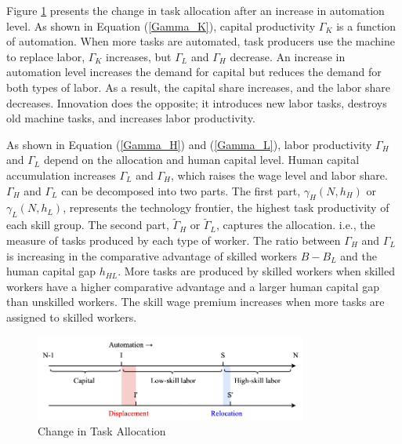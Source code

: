 \documentclass[12pt]{article}
\begin{document}
Figure \ref{allocation2} presents the change in task allocation after an increase in automation level. As shown in Equation (\ref{Gamma_K}), capital productivity $\Gamma_K$ is a function of automation. When more tasks are automated, task producers use the machine to replace labor, $\Gamma_K$ increases, but $\Gamma_L$ and $\Gamma_H$ decrease. An increase in automation level increases the demand for capital but reduces the demand for both types of labor. As a result, the capital share increases, and the labor share decreases. Innovation does the opposite; it introduces new labor tasks, destroys old machine tasks, and increases labor productivity. 

As shown in Equation (\ref{Gamma_H}) and (\ref{Gamma_L}), labor productivity $\Gamma_H$ and $\Gamma_L$ depend on the allocation and human capital level. Human capital accumulation increases $\Gamma_L$ and $\Gamma_H$, which raises the wage level and labor share. $\Gamma_H$ and $\Gamma_L$ can be decomposed into two parts. The first part, $\gamma_H(N,h_H)$ or $\gamma_L(N,h_L)$, represents the technology frontier, the highest task productivity of each skill group. The second part, $\tilde{\Gamma}_H$ or $\tilde{\Gamma}_L$, captures the allocation. i.e., the measure of tasks produced by each type of worker. The ratio between $\Gamma_H$ and $\Gamma_L$ is increasing in the comparative advantage of skilled workers $B-B_L$ and the human capital gap $h_{HL}$. More tasks are produced by skilled workers when skilled workers have a higher comparative advantage and a larger human capital gap than unskilled workers. The skill wage premium increases when more tasks are assigned to skilled workers. 

\begin{figure}[h!]
\center
\includegraphics[width=0.8\textwidth]{allocation2}
\caption{Change in Task Allocation}
\label{allocation2}
\end{figure}
\end{document}

